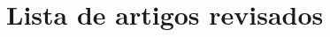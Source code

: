 
\begin{apendicesenv}


\partapendices
\

\chapter{Lista de artigos revisados} %
\label{chap:apendiceA}
\lipsum[3-6]


\end{apendicesenv}
